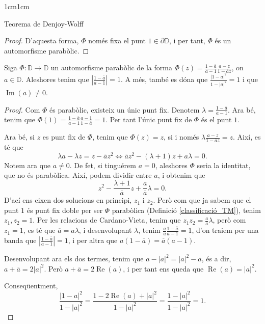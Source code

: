 \begin{adjustwidth}{1cm}{1cm}
\begin{subsection}{Teorema de Denjoy-Wolff}
\begin{proof}
        D'aquesta forma, $\Phi$ només fixa el punt $1\in\partial \mathbb{D}$, i per tant, $\Phi$ és un automorfisme parabòlic.
    \end{proof}

    \begin{lema}
        Siga $\Phi:\mathbb{D}\to \mathbb{D}$ un automorfisme parabòlic de la forma $\Phi(z)=\frac{1-\overline{a}}{a-1}\frac{a-z}{1-\overline{a}z}$, on $a\in \mathbb{D}$. Aleshores tenim que $\left|\frac{1-\overline{a}}{a-1}\right|=1$. A més, també es dóna que $\frac{|1-a|^2}{1-|a|^2}=1$ i que $\operatorname{Im}(a)\neq 0$.
        \label{forma_phi_parab_dw}
    \end{lema}

    \begin{proof}
        Com $\Phi$ és parabòlic, existeix un únic punt fix. Denotem $\lambda=\frac{1-\overline{a}}{a-1}$. Ara bé, tenim que $\Phi(1)=\frac{1-\overline{a}}{a-1}\frac{a-1}{1-\overline{a}}=1$. Per tant l'únic punt fix de $\Phi$ és el punt $1$.

        Ara bé, si $z$ es punt fix de $\Phi$, tenim que $\Phi(z)=z$, si i només $\lambda \frac{a-z}{1-\overline{a}z}=z$. Així, es té que
        \[
            \lambda a-\lambda z=z-\overline{a}z^2 \iff \overline{a}z^2-(\lambda+1)z+a\lambda=0.
        \]
        Notem ara que $a\neq 0$. De fet, si tinguérem $a=0$, aleshores $\Phi$ seria la identitat, que no és parabòlica.
        Així, podem dividir entre $a$, i obtenim que 
        \[
            z^2-\frac{\lambda+1}{\overline{a}}z+\frac{a}{\overline{a}}\lambda=0.
        \]
        D'ací ens eixen dos solucions en principi, $z_1$ i $z_2$. Però com que ja sabem que el punt $1$ és punt fix doble per ser $\Phi$ parabòlica (Definició \ref{classificació_TM}), tenim $z_1,z_2=1$.
        Per les relacions de Cardano-Vieta, tenim que $z_1z_2=\frac{a}{\overline{a}}\lambda$, però com $z_1=1$, es té que $\overline{a} =a\lambda$, i desenvolupant $\lambda$, tenim $\frac{a}{\overline{a}}\frac{1-\overline{a}}{a-1}=1$, d'on traiem per una banda que $\left|\frac{1-\overline{a}}{a-1}\right|=1$, i per altra que $a(1-\overline{a})=\overline{a}(a-1)$. 
        
        Desenvolupant ara els dos termes, tenim que  $a-|a|^2=|a|^2-\overline{a}$, és a dir, $a+\overline{a}=2|a|^2$. Però $a+\overline{a}=2\operatorname{Re}(a)$, i per tant ens queda que $\operatorname{Re}(a)=|a|^2$.

        Conseqüentment, 
        \[
            \frac{|1-a|^2}{1-|a|^2}=\frac{1-2\operatorname{Re}(a)+|a|^2}{1-|a|^2}=\frac{1-|a|^2}{1-|a|^2}=1.
        \]


\end{proof}
\end{subsection}
\end{adjustwidth}
